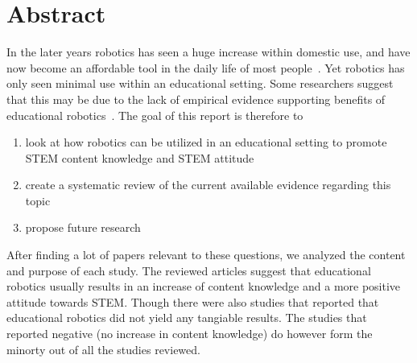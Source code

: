 \section*{Abstract}
	In the later years robotics has seen a huge increase within domestic use, and have now become an affordable tool in the daily life of most people~\cite{kara2003sizing,hsiu2003designing}.
	Yet robotics has only seen minimal use within an educational setting. Some researchers suggest that this may be due to the lack of empirical evidence
	supporting benefits of educational robotics~\cite{williams2007acquisition}. 
	The goal of this report is therefore to 
	\begin{enumerate}
		\item look at how robotics can be utilized in an educational setting to promote STEM content knowledge and STEM attitude
		\item create a systematic review of the current available evidence regarding this topic
		\item propose future research
	\end{enumerate}
	
	\bigskip\noindent
	After finding a lot of papers relevant to these questions, we analyzed the content and purpose of each study.
	The reviewed articles suggest that educational robotics usually results in an increase of content knowledge and a more positive attitude towards STEM. 
	Though there were also studies that reported that educational robotics did not yield any tangiable results. 
	The studies that reported negative (no increase in content knowledge) do however form the minorty out of all the studies reviewed. 
	